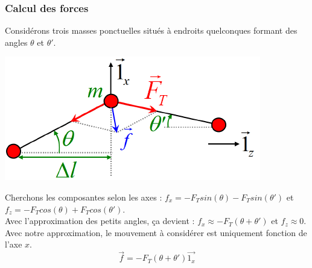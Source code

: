 \documentclass	[11pt, a4paper, openany]{book}
\begin{document}
		\subsubsection{Calcul des forces}
		Considérons trois masses ponctuelles situés à endroits quelconques formant des angles $\theta$ et $\theta '$.
		\begin{center}
			\includegraphics[scale=0.5]{oo/image23.png}
		\end{center}
		Cherchons les composantes selon les axes : $f_x = -F_Tsin(\theta) - F_Tsin(\theta ')$ et $f_z = -F_Tcos(\theta) + F_Tcos(\theta ')$.\\
		Avec l'approximation des petits angles, ça devient : $f_x \approx -F_T(\theta + \theta ')$ et $f_z \approx 0$. Avec notre approximation, le mouvement à considérer est uniquement fonction de l'axe $x$.
		\begin{equation}
			\vec{f} = -F_T(\theta + \theta ')\vec{1_x}
		\end{equation}
		
\end{document}
